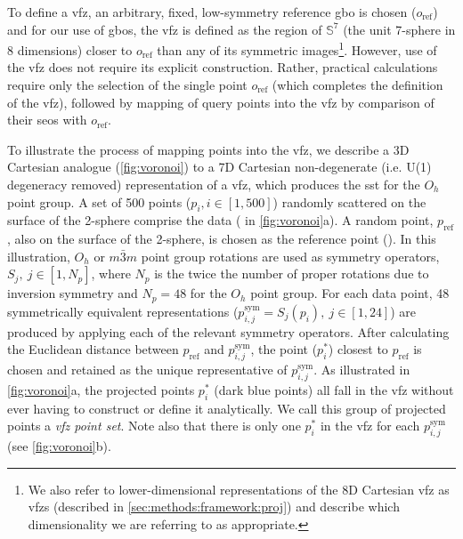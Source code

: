 \documentclass[final,twocolumn,12pt]{elsarticle}
\begin{document}
To define a \gls{vfz}, an arbitrary, fixed, low-symmetry reference \gls{gbo} is chosen ($o_{\text{ref}}$) and for our use of \glspl{gbo}, the \gls{vfz} is defined as the region of $\mathbb{S}^7$ (the unit 7-sphere in 8 dimensions) closer to $o_{\text{ref}}$ than any of its symmetric images\footnote{We also refer to lower-dimensional representations of the 8D Cartesian \gls{vfz} as \glspl{vfz} (described in \cref{sec:methods:framework:proj}) and describe which dimensionality we are referring to as appropriate. }. However, use of the \gls{vfz} does not require its explicit construction. Rather, practical calculations require only the selection of the single point $o_{\text{ref}}$ (which completes the definition of the \gls{vfz}), followed by mapping of query points into the \gls{vfz} by comparison of their \glspl{seo} with $o_{\text{ref}}$.

To illustrate the process of mapping points into the \gls{vfz}, we describe a 3D Cartesian analogue (\cref{fig:voronoi}) to a 7D Cartesian non-degenerate (i.e. U(1) degeneracy removed) representation of a \gls{vfz}, which produces the \gls{sst} \cite{patalaSymmetriesRepresentationGrain2013} for the $O_h$ point group. A set of \num{500} points ($p_i, i\in[1,500]$) randomly scattered on the surface of the 2-sphere comprise the data (\startpt{} in \cref{fig:voronoi}a). A random point, $p_{\text{ref}}$, also on the surface of the 2-sphere, is chosen as the reference point (). In this illustration, $O_h$ or $m\bar{3}m$ point group rotations are used as symmetry operators, $S_j,\ j\in[1,N_p]$, where $N_p$ is the twice the number of proper rotations due to inversion symmetry and $N_p = 48$ for the $O_h$  point group. For each data point, \num{48} symmetrically equivalent representations ($p^{\text{sym}}_{i,j} = S_j(p_i),\ j\in[1,24]$) are produced by applying each of the relevant symmetry operators. After calculating the Euclidean distance between $p_{\text{ref}}$ and $p^{\text{sym}}_{i,j}$, the point ($p^{*}_i$) closest to $p_{\text{ref}}$ is chosen and retained as the unique representative of $p^{\text{sym}}_{i,j}$. As illustrated in \cref{fig:voronoi}a, the projected points $p^{*}_i$ (dark blue points) all fall in the \gls{vfz} without ever having to construct or define it analytically. We call this group of projected points a \textit{\gls{vfz} point set}. Note also that there is only one $p^{*}_i$ in the \gls{vfz} for each $p^{\text{sym}}_{i,j}$ (see \cref{fig:voronoi}b).
\end{document}
